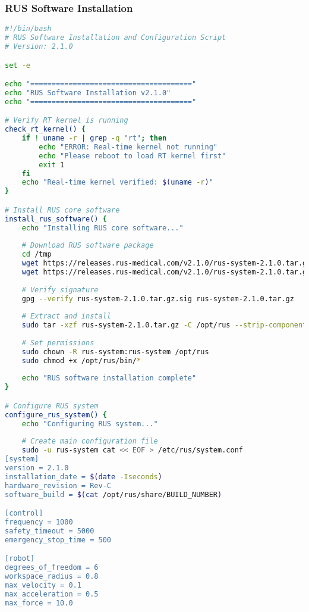 \subsubsection{RUS Software Installation}

\begin{lstlisting}[language=bash, caption={RUS Software Installation Script}, label={lst:app-software-install}]
#!/bin/bash
# RUS Software Installation and Configuration Script
# Version: 2.1.0

set -e

echo "======================================"
echo "RUS Software Installation v2.1.0"
echo "======================================"

# Verify RT kernel is running
check_rt_kernel() {
    if ! uname -r | grep -q "rt"; then
        echo "ERROR: Real-time kernel not running"
        echo "Please reboot to load RT kernel first"
        exit 1
    fi
    echo "Real-time kernel verified: $(uname -r)"
}

# Install RUS core software
install_rus_software() {
    echo "Installing RUS core software..."
    
    # Download RUS software package
    cd /tmp
    wget https://releases.rus-medical.com/v2.1.0/rus-system-2.1.0.tar.gz
    wget https://releases.rus-medical.com/v2.1.0/rus-system-2.1.0.tar.gz.sig
    
    # Verify signature
    gpg --verify rus-system-2.1.0.tar.gz.sig rus-system-2.1.0.tar.gz
    
    # Extract and install
    sudo tar -xzf rus-system-2.1.0.tar.gz -C /opt/rus --strip-components=1
    
    # Set permissions
    sudo chown -R rus-system:rus-system /opt/rus
    sudo chmod +x /opt/rus/bin/*
    
    echo "RUS software installation complete"
}

# Configure RUS system
configure_rus_system() {
    echo "Configuring RUS system..."
    
    # Create main configuration file
    sudo -u rus-system cat << EOF > /etc/rus/system.conf
[system]
version = 2.1.0
installation_date = $(date -Iseconds)
hardware_revision = Rev-C
software_build = $(cat /opt/rus/share/BUILD_NUMBER)

[control]
frequency = 1000
safety_timeout = 5000
emergency_stop_time = 500

[robot]
degrees_of_freedom = 6
workspace_radius = 0.8
max_velocity = 0.1
max_acceleration = 0.5
max_force = 10.0


\end{lstlisting}

